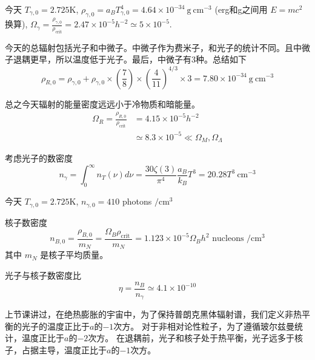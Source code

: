 \documentclass[]{ctexart}
\begin{document}
今天 $T_{\gamma,0} = 2.725 \mathrm{K}$, $\rho_{\gamma,0}=a_B T_{\gamma,0}^4 = 4.64\times 10^{-34} \mathrm{~g~cm^{-3}}$ (erg和g之间用 $E=mc^2$ 换算),
$\Omega_\gamma = \frac{\rho_{\gamma,0}}{\rho_\text{crit}} = 2.47\times 10^{-5} h^{-2} \simeq 5\times 10^{-5}$.

今天的总辐射包括光子和中微子。中微子作为费米子，和光子的统计不同。且中微子退耦更早，所以温度低于光子。最后，中微子有3种。总结如下
\begin{equation}
    \rho_{R, 0}=\rho_{\gamma, 0}+\rho_{\gamma, 0} \times\left(\frac{7}{8}\right) \times\left(\frac{4}{11}\right)^{4 / 3} \times 3 =7.80 \times 10^{-34} \mathrm{~g~cm^{-3}}
\end{equation}

总之今天辐射的能量密度远远小于冷物质和暗能量。
\begin{equation}
    \begin{aligned}
        \Omega_{R}=\frac{\rho_{R, 0}}{\rho_\text{crit}} &=4.15 \times 10^{-5} h^{-2} \\
        & \simeq 8.3 \times 10^{-5} \ll \Omega_M, \Omega_\Lambda
    \end{aligned}
\end{equation}

考虑光子的数密度
\begin{equation}
    n_{\gamma}=\int_{0}^{\infty} n_{T}(\nu) d \nu=\frac{30 \zeta(3)}{\pi^{4}} \frac{a_{B}}{k_{B}} T^{3}=20.28 T^{3} \mathrm{~cm}^{-3}
\end{equation}

今天 $T_{\gamma,0} = 2.725 \mathrm{K}$, $n_{\gamma, 0}=410$ photons $/ \mathrm{cm}^{3}$

核子数密度
\begin{equation}
    n_{B, 0}=\frac{\rho_{B, 0}}{m_{N}}=\frac{\Omega_{B} \rho_{\text {crit }}}{m_{N}}=1.123 \times 10^{-5} \Omega_{B} h^{2} \text { nucleons } / \mathrm{cm}^{3}
\end{equation}
其中 $m_{N}$ 是核子平均质量。

光子与核子数密度比
\begin{equation}
    \eta = \frac{n_{B}}{n_{\gamma}} \simeq 4.1\times 10^{-10}
\end{equation}

上节课讲过，在绝热膨胀的宇宙中，为了保持普朗克黑体辐射谱，我们定义非热平衡的光子的温度正比于$a$的$-1$次方。
对于非相对论性粒子，为了遵循玻尔兹曼统计，温度正比于$a$的$-2$次方。
在退耦前，光子和核子处于热平衡，光子远多于核子，占据主导，温度正比于$a$的$-1$次方。
\end{document}
